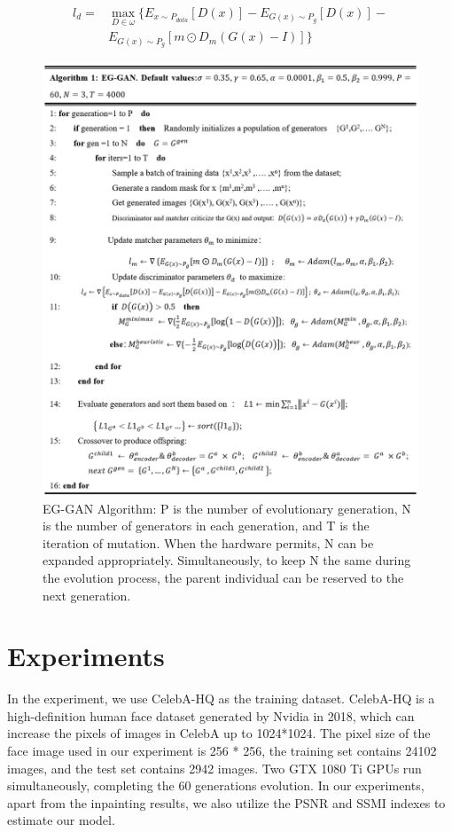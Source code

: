 \documentclass[journal]{IEEEtran}
\begin{document}
\begin{equation}
\begin{aligned}
l_d = &\max_{D\in\omega} \{E_{x \sim P_{data}}[D(x)] - E_{G(x) \sim P_g}[D(x)] - \\
    &E_{G(x) \sim P_g}[m \odot D_m(G(x) - I)]\}
\end{aligned}
\end{equation}
\begin{figure}[H]
\centering
\includegraphics[width=1\linewidth]{figures/Fig3.png}
\caption{EG-GAN Algorithm: P is the number of evolutionary generation, N is the number of generators in each generation, and T is the iteration of mutation. When the hardware permits, N can be expanded appropriately. Simultaneously, to keep N the same during the evolution process, the parent individual can be reserved to the next generation.}
\label{fig:Fig3}
\end{figure}

\section{Experiments}
In the experiment, we use CelebA-HQ\cite{karras2017progressive} as the training dataset. CelebA-HQ is a high-definition human face dataset generated by Nvidia in 2018, which can increase the pixels of images in CelebA\cite{liu2015deep} up to 1024*1024. The pixel size of the face image used in our experiment is 256 * 256, the training set contains 24102 images, and the test set contains 2942 images. Two GTX 1080 Ti GPUs run simultaneously, completing the 60 generations evolution. In our experiments, apart from the inpainting results, we also utilize the PSNR and SSMI indexes\cite{ledig2017photo} to estimate our model.
\end{document}
